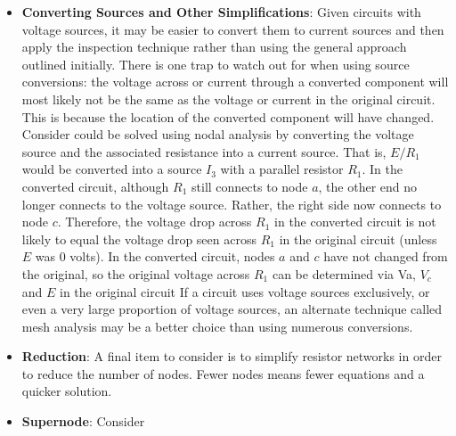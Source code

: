 \documentclass{report}
\begin{document}
\begin{itemize}
             Thus,
             \begin{align*}
                 V_{a}  &= 8.62V \\
                 V_{b} &= 7.8V \\
                 V_{c} &= 8.17V
             .\end{align*}
            \item \textbf{Converting Sources and Other Simplifications}: Given circuits with voltage sources, it may be easier to convert them to current sources and then apply the inspection technique rather than using the general approach outlined initially. There is one trap to watch out for when using source conversions: the voltage across or current through a converted component will most likely not be the same as the voltage or current in the original circuit. This is because the location of the converted component will have changed. 
                \bigbreak \noindent 
                Consider
                \bigbreak \noindent 
                \bigbreak \noindent 
                could be solved using nodal analysis by converting the voltage source and the associated resistance into a current source. That is, $E/R_{1}$ would be converted into a source $I_{3}$ with a parallel resistor $R_{1}$.
                \bigbreak \noindent 
                \bigbreak \noindent 
                In the converted circuit, although $R_1$ still connects to node $a$, the other end no longer connects to the voltage source. Rather, the right side now connects to node $c$. Therefore, the voltage drop across $R_1$ in the converted circuit is not likely to equal the voltage drop seen across $R_1$ in the original circuit (unless $E$ was 0 volts).
                \bigbreak \noindent 
                In the converted circuit, nodes $a$ and $c$ have not changed from the original, so the original voltage across $R_1$ can be determined via Va, $V_{c}$ and $E$ in the original circuit
                \bigbreak \noindent 
                If a circuit uses voltage sources exclusively, or even a very large proportion of voltage sources, an alternate technique called mesh analysis may be a better choice than using numerous conversions. 
            \item \textbf{Reduction}: A final item to consider is to simplify resistor networks in order to reduce the number of nodes. Fewer nodes means fewer equations and a quicker solution.
            \item \textbf{Supernode}: Consider

\end{itemize}
\end{document}
